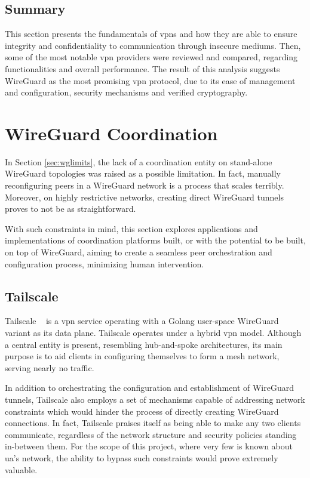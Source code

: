 \documentclass[11pt,twoside,a4paper]{report}
\begin{document}
\subsection{Summary}

This section presents the fundamentals of \acp{vpn} and how they are able to ensure integrity and confidentiality to communication through insecure mediums. Then, some of the most notable \ac{vpn} providers were reviewed and compared, regarding functionalities and overall performance. The result of this analysis suggests WireGuard as the most promising \ac{vpn} protocol, due to its ease of management and configuration, security mechanisms and verified cryptography.


\section{WireGuard Coordination}
\label{sec:coordination}

In Section \ref{sec:wglimits}, the lack of a coordination entity on stand-alone WireGuard topologies was raised as a possible limitation. In fact, manually reconfiguring peers in a WireGuard network is a process that scales terribly. Moreover, on highly restrictive networks, creating direct WireGuard tunnels proves to not be as straightforward.

With such constraints in mind, this section explores applications and implementations of coordination platforms built, or with the potential to be built, on top of WireGuard, aiming to create a seamless peer orchestration and configuration process, minimizing human intervention.

\subsection{Tailscale}

Tailscale ~\cite{tailscale2020online} is a \ac{vpn} service operating with a Golang user-space WireGuard variant as its data plane. Tailscale operates under a hybrid \ac{vpn} model. Although a central entity is present, resembling hub-and-spoke architectures, its main purpose is to aid clients in configuring themselves to form a mesh network, serving nearly no traffic.

In addition to orchestrating the configuration and establishment of WireGuard tunnels, Tailscale also employs a set of mechanisms capable of addressing network constraints which would hinder the process of directly creating WireGuard connections. In fact, Tailscale praises itself as being able to make any two clients communicate, regardless of the network structure and security policies standing in-between them. For the scope of this project, where very few is known about \ac{ua}'s network, the ability to bypass such constraints would prove extremely valuable.
\end{document}
